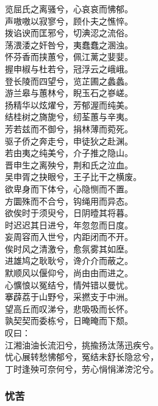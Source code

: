 \documentclass[]{article}
\begin{document}
览屈氏之离骚兮，心哀哀而怫郁。\\
声嗷嗷以寂寥兮，顾仆夫之憔悴。\\
拨谄谀而匡邪兮，切淟涊之流俗。\\
荡渨涹之奸咎兮，夷蠢蠢之溷浊。\\
怀芬香而挟蕙兮，佩江蓠之婓婓。\\
握申椒与杜若兮，冠浮云之峨峨。\\
登长陵而四望兮，览芷圃之蠡蠡。\\
游兰皋与蕙林兮，睨玉石之嵾嵯。\\
扬精华以炫燿兮，芳郁渥而纯美。\\
结桂树之旖旎兮，纫荃蕙与辛夷。\\
芳若兹而不御兮，捐林薄而菀死。\\
驱子侨之奔走兮，申徒狄之赴渊。\\
若由夷之纯美兮，介子推之隐山。\\
晋申生之离殃兮，荆和氏之泣血。\\
吴申胥之抉眼兮，王子比干之横废。\\
欲卑身而下体兮，心隐恻而不置。\\
方圜殊而不合兮，钩绳用而异态。\\
欲俟时于须臾兮，日阴曀其将暮。\\
时迟迟其日进兮，年忽忽而日度。\\
妄周容而入世兮，内距闭而不开。\\
俟时风之清激兮，愈氛雾其如塺。\\
进雄鸠之耿耿兮，谗介介而蔽之。\\
默顺风以偃仰兮，尚由由而进之。\\
心懭悢以冤结兮，情舛错以曼忧。\\
搴薜荔于山野兮，采撚支于中洲。\\
望高丘而叹涕兮，悲吸吸而长怀。\\
孰契契而委栋兮，日晻晻而下颓。\\
叹曰：\\
江湘油油长流汩兮，挑揄扬汰荡迅疾兮。\\
忧心展转愁怫郁兮，冤结未舒长隐忿兮，\\
丁时逢殃可奈何兮，劳心悁悁涕滂沱兮。

\hypertarget{header-n346}{%
\subsubsection{忧苦}\label{header-n346}}
\end{document}
